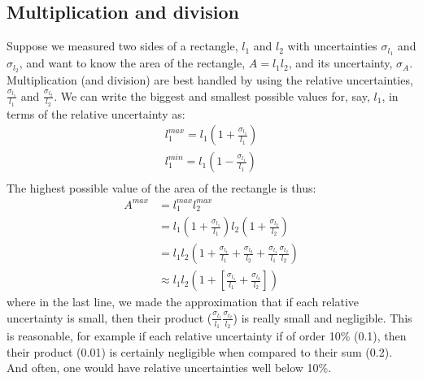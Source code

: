 \subsection{Multiplication and division}
Suppose we measured two sides of a rectangle, $l_1$ and $l_2$ with uncertainties $\sigma_{l_1}$ and $\sigma_{l_2}$, and want to know the area of the rectangle, $A=l_1l_2$, and its uncertainty, $\sigma_{A}$. Multiplication (and division) are best handled by using the relative uncertainties, $\frac{\sigma_{l_1}}{l_1}$ and $\frac{\sigma_{l_2}}{l_2}$. We can write the biggest and smallest possible values for, say, $l_1$, in terms of the relative uncertainty as:
\begin{align}
l_1^{max}=l_1\left(1+\frac{\sigma_{l_1}}{l_1}\right)\nonumber\\
l_1^{min}=l_1\left(1-\frac{\sigma_{l_1}}{l_1}\right)\nonumber\\
\end{align}
The highest possible value of the area of the rectangle is thus:
\begin{align}
A^{max}&=l_1^{max}l_2^{max}\nonumber\\
  &=l_1\left(1+\frac{\sigma_{l_1}}{l_1}\right)l_2\left(1+\frac{\sigma_{l_2}}{l_2}\right)\nonumber\\
  &=l_1l_2\left(1+\frac{\sigma_{l_1}}{l_1}+\frac{\sigma_{l_2}}{l_2}+\frac{\sigma_{l_1}}{l_1}\frac{\sigma_{l_2}}{l_2}\right)\nonumber\\
  &\approx l_1l_2\left(1+\left[\frac{\sigma_{l_1}}{l_1}+\frac{\sigma_{l_2}}{l_2}\right]\right)
\end{align}
where in the last line, we made the approximation that if each relative uncertainty is small, then their product ($\frac{\sigma_{l_1}}{l_1}\frac{\sigma_{l_2}}{l_2}$) is really small and negligible. This is reasonable, for example if each relative uncertainty if of order 10\% (0.1), then their product (0.01) is certainly negligible when compared to their sum (0.2). And often, one would have relative uncertainties well below 10\%.

